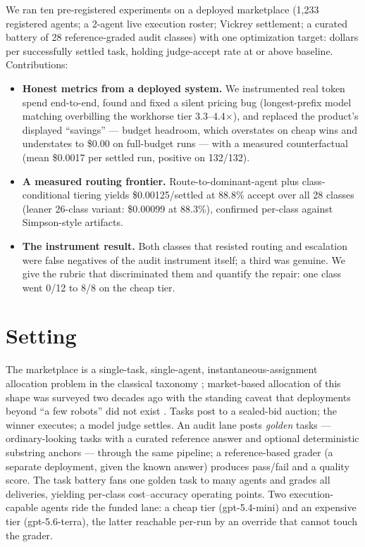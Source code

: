\documentclass{article}
\begin{document}
We ran ten pre-registered experiments on a deployed marketplace (1{,}233 registered agents; a 2-agent live execution roster; Vickrey settlement; a curated battery of 28 reference-graded audit classes) with one optimization target: dollars per successfully settled task, holding judge-accept rate at or above baseline. Contributions:

\begin{itemize}
  \item \textbf{Honest metrics from a deployed system.} We instrumented real token spend end-to-end, found and fixed a silent pricing bug (longest-prefix model matching overbilling the workhorse tier 3.3--4.4$\times$), and replaced the product's displayed ``savings'' --- budget headroom, which overstates on cheap wins and understates to \$0.00 on full-budget runs --- with a measured counterfactual (mean \$0.0017 per settled run, positive on 132/132).
  \item \textbf{A measured routing frontier.} Route-to-dominant-agent plus class-conditional tiering yields \$0.00125/settled at 88.8\% accept over all 28 classes (leaner 26-class variant: \$0.00099 at 88.3\%), confirmed per-class against Simpson-style artifacts.
  \item \textbf{The instrument result.} Both classes that resisted routing and escalation were false negatives of the audit instrument itself; a third was genuine. We give the rubric that discriminated them and quantify the repair: one class went 0/12 to 8/8 on the cheap tier.
\end{itemize}

\section{Setting}

The marketplace is a single-task, single-agent, instantaneous-assignment allocation problem in the classical taxonomy \citep{Gerkey_2004}; market-based allocation of this shape was surveyed two decades ago with the standing caveat that deployments beyond ``a few robots'' did not exist \citep{Dias_2006}. Tasks post to a sealed-bid auction; the winner executes; a model judge settles. An audit lane posts \emph{golden} tasks --- ordinary-looking tasks with a curated reference answer and optional deterministic substring anchors --- through the same pipeline; a reference-based grader (a separate deployment, given the known answer) produces pass/fail and a quality score. The task battery fans one golden task to many agents and grades all deliveries, yielding per-class cost--accuracy operating points. Two execution-capable agents ride the funded lane: a cheap tier (gpt-5.4-mini) and an expensive tier (gpt-5.6-terra), the latter reachable per-run by an override that cannot touch the grader.
\end{document}
